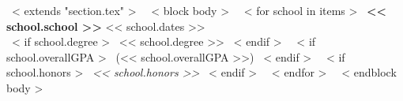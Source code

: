 ~< extends "section.tex" >~
~< block body >~
~< for school in items >~
  {\bf << school.school >>}
  {\hfill}
  << school.dates >> \\
  ~< if school.degree >~
    << school.degree >>
  ~< endif >~
  ~< if school.overallGPA >~
    (<< school.overallGPA >>)
  ~< endif >~
  ~< if school.honors >~
    \newline
    {\it << school.honors >>}
  ~< endif >~
  \newline
~< endfor >~
~< endblock body >~
